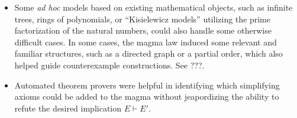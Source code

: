 \begin{itemize}
    \item Some \emph{ad hoc} models based on existing mathematical objects, such as infinite trees, rings of polynomials, or ``Kisielewicz models'' utilizing the prime factorization of the natural numbers, could also handle some otherwise difficult cases.  In some cases, the magma law induced some relevant and familiar structures, such as a directed graph or a partial order, which also helped guide counterexample constructions.  See ???.
    \item Automated theorem provers were helpful in identifying which simplifying axioms could be added to the magma without jeapordizing the ability to refute the desired implication $E \vdash E'$.
\end{itemize}

